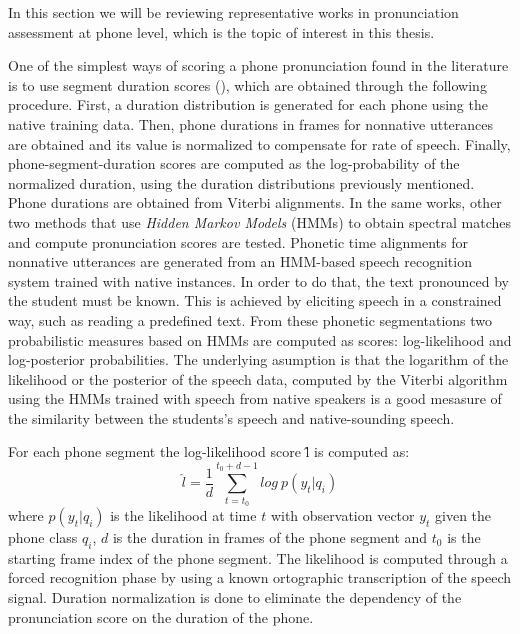 In this section we will be reviewing representative works in pronunciation assessment
at phone level, which is the topic of interest in this thesis.

One of the simplest ways of scoring a phone pronunciation found in the literature 
is to use segment duration scores (\cite{pronunciation_scoring_instruction, pronunciation_scoring_phone_segments_instruction}), which are obtained through the following
procedure. First, a duration distribution is generated for each phone
using the native training data. 
Then, phone durations in frames for nonnative utterances are obtained 
and its value is normalized to compensate for rate of speech. 
Finally, phone-segment-duration scores are computed as 
the log-probability of the normalized duration, using the duration 
distributions previously mentioned. Phone durations are obtained from Viterbi alignments.
In the same works, other two methods that use \textit{Hidden Markov Models} (HMMs) to obtain 
spectral matches and compute pronunciation scores are tested. 
Phonetic time alignments for
nonnative utterances are generated from an HMM-based speech recognition system trained
with native instances. In order to do that, the text pronounced by the student 
must be known. This is achieved by eliciting speech in a
constrained way, such as reading a predefined text.
From these phonetic segmentations two 
probabilistic measures based on HMMs are computed as scores: log-likelihood and 
log-posterior probabilities. The underlying asumption is that the logarithm of the likelihood
or the posterior of the speech data, computed by the Viterbi 
algorithm using the HMMs trained with speech from native
speakers is a good mesasure of the similarity between the students's
speech and native-sounding speech.

For each phone segment the log-likelihood score \^{l} is computed as:
\begin{equation}
\label{eq:logLikelihood}
\hat{l} = \frac{1}{d} \sum_{t=t_{0}}^{t_{0}+d-1} log \ p(y_{t}|q_{i})
\end{equation}
where $p(y_{t}|q_{i})$ is the likelihood at time $t$ with observation vector $y_{t}$
given the phone class $q_{i}$, $d$ is the duration in frames of the phone segment 
and $t_{0}$ is the starting frame index of the phone segment. 
The likelihood is computed through a forced recognition phase by using a known ortographic
transcription of the speech signal. Duration normalization is done to 
eliminate the dependency of the pronunciation score on the duration of the phone.

